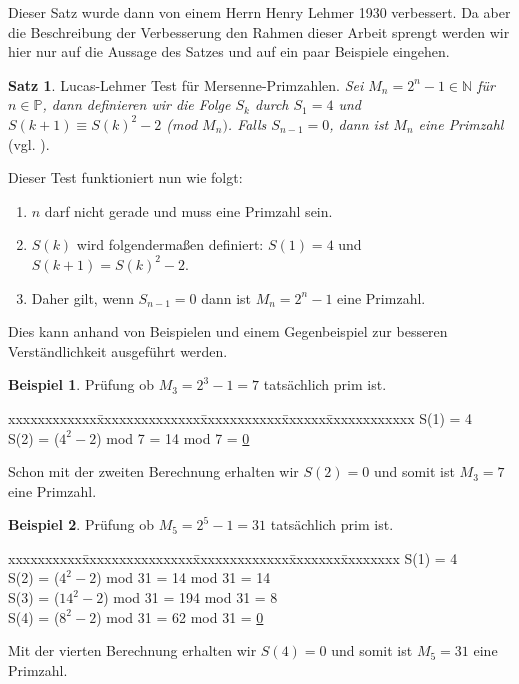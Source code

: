 \documentclass[12pt,a4paper]{article}
\theoremstyle{definition}
\newtheorem{satz}{Satz}[subsection]
\newtheorem{bsp}{Beispiel}[subsection]
\begin{document}
Dieser Satz wurde dann von einem Herrn Henry Lehmer 1930 verbessert.
Da aber die Beschreibung der Verbesserung den Rahmen dieser Arbeit sprengt werden wir hier nur auf die Aussage des Satzes und auf ein paar Beispiele eingehen.
\begin{satz}{Lucas-Lehmer Test für Mersenne-Primzahlen}.\newline
\textit{Sei $M_n = 2^n-1 \in \mathbb{N}$ für $n \in \mathbb{P}$, dann definieren wir die Folge $S_k$ durch $S_1 = 4$ und $S(k + 1) \equiv S(k)^2 - 2$ (mod $M_n)$. Falls $S_{n-1} = 0$, dann ist $M_n$ eine Primzahl} (vgl. \cite[183]{Crandall2005}).
\end{satz}
Dieser Test funktioniert nun wie folgt:
\begin{enumerate}
    \item $n$ darf nicht gerade und muss eine Primzahl sein.
    \item $S(k)$ wird folgendermaßen definiert: $S(1) = 4$ und $S(k + 1) = S(k)^2 - 2$.
    \item Daher gilt, wenn $S_{n - 1} = 0$ dann ist $M_n = 2^n - 1$ eine Primzahl.
\end{enumerate}

Dies kann anhand von Beispielen und einem Gegenbeispiel zur besseren Verständlichkeit ausgeführt werden.
\begin{bsp}{Prüfung ob $M_3 = 2^3 - 1 = 7$ tatsächlich prim ist}.
\begin{tabbing}
xxxxxxxxxxxx\=xxxxxxxxxxxxxx\=xxxxxxxxxxx\=xxxxxx\=xxxxxxxxxxxx\kill
\> S(1) = 4 \\
\> S(2) = ($4^2 - 2$) \> mod 7 = 14 \> mod 7 \> = \underline{0}
\end{tabbing}
Schon mit der zweiten Berechnung erhalten wir $S(2) = 0$ und somit ist $M_3 = 7$ eine Primzahl.
\end{bsp}

\begin{bsp}{Prüfung ob $M_5 = 2^5 - 1 = 31$ tatsächlich prim ist}.
\begin{tabbing}
xxxxxxxxxx\=xxxxxxxxxxxxxxx\=xxxxxxxxxxxxx\=xxxxxxx\=xxxxxxxx\kill
\> S(1) = 4 \\
\> S(2) = ($4^2 - 2$)  \> mod 31 = 14  \> mod 31 \> = 14 \\
\> S(3) = ($14^2 - 2$) \> mod 31 = 194 \> mod 31 \> = 8 \\
\> S(4) = ($8^2 - 2$)  \> mod 31 = 62  \> mod 31 \> = \underline{0}
\end{tabbing}
Mit der vierten Berechnung erhalten wir $S(4) = 0$ und somit ist $M_5 = 31$ eine Primzahl.
\end{bsp}
\end{document}
